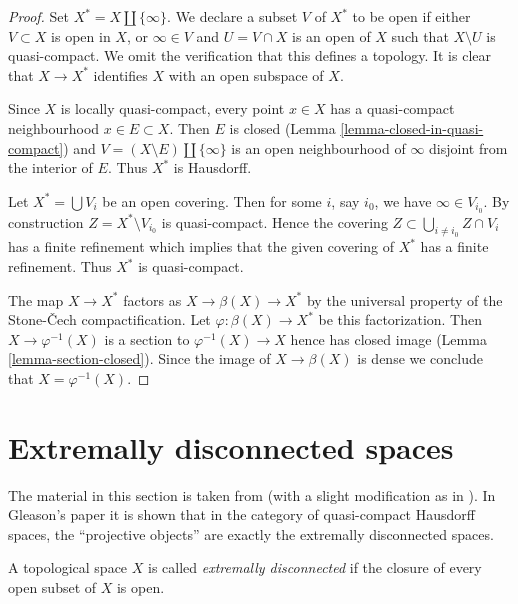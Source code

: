\begin{proof}
Set $X^* = X \amalg \{\infty\}$. We declare a subset $V$ of $X^*$ to be
open if either $V \subset X$ is open in $X$, or $\infty \in V$ and
$U = V \cap X$ is an open of $X$ such that $X \setminus U$ is quasi-compact.
We omit the verification that this defines a topology. It is clear
that $X \to X^*$ identifies $X$ with an open subspace of $X$.

\medskip\noindent
Since $X$ is locally quasi-compact, every point $x \in X$ has a
quasi-compact neighbourhood $x \in E \subset X$. Then $E$
is closed (Lemma \ref{lemma-closed-in-quasi-compact}) and
$V = (X \setminus E) \amalg \{\infty\}$ is an open neighbourhood
of $\infty$ disjoint from the interior of $E$. Thus $X^*$ is Hausdorff.

\medskip\noindent
Let $X^* = \bigcup V_i$ be an open covering. Then for some $i$, say $i_0$,
we have $\infty \in V_{i_0}$. By construction $Z = X^* \setminus V_{i_0}$
is quasi-compact. Hence the covering
$Z \subset \bigcup_{i \not = i_0} Z \cap V_i$ has a finite refinement which
implies that the given covering of $X^*$ has a finite refinement.
Thus $X^*$ is quasi-compact.

\medskip\noindent
The map $X \to X^*$ factors as $X \to \beta(X) \to X^*$ by the universal
property of the Stone-{\v C}ech compactification. Let
$\varphi : \beta(X) \to X^*$ be this factorization.
Then $X \to \varphi^{-1}(X)$ is a section to
$\varphi^{-1}(X) \to X$ hence has closed image
(Lemma \ref{lemma-section-closed}).
Since the image of $X \to \beta(X)$ is dense we conclude that
$X = \varphi^{-1}(X)$.
\end{proof}










\section{Extremally disconnected spaces}
\label{section-extremally-disconnected}

\noindent
The material in this section is taken from \cite{Gleason}
(with a slight modification as in \cite{Rainwater}).
In Gleason's paper it is shown that in the category of quasi-compact
Hausdorff spaces, the ``projective objects'' are exactly the extremally
disconnected spaces.

\begin{definition}
\label{definition-extremally-disconnected}
A topological space $X$ is called {\it extremally disconnected}
if the closure of every open subset of $X$ is open.
\end{definition}

